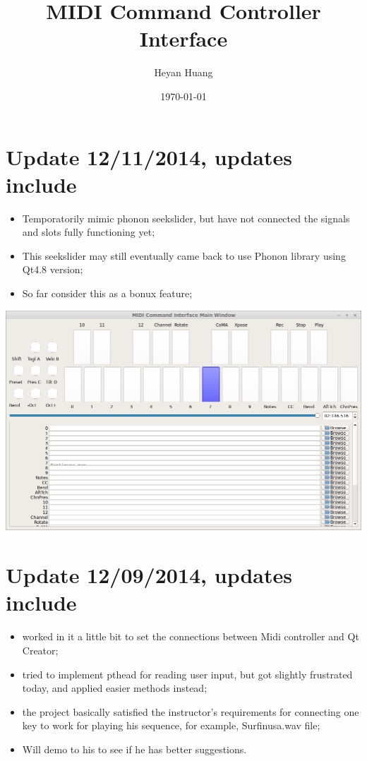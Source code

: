 \documentclass[9pt,b5paper]{article}
\author{Heyan Huang}
\date{\today}
\title{MIDI Command Controller Interface}
\begin{document}
\maketitle
\tableofcontents


\section{Update 12/11/2014, updates include}
\label{sec-1}
\begin{itemize}
\item Temporatorily mimic phonon seekslider, but have not connected the signals and slots fully functioning yet;
\item This seekslider may still eventually came back to use Phonon library using Qt4.8 version;
\item So far consider this as a bonux feature;
\end{itemize}
\includegraphics[width=.9\linewidth]{./pic/Screenshot_from_2014-12-11_13:33:46.png}

\section{Update 12/09/2014, updates include}
\label{sec-2}
\begin{itemize}
\item worked in it a little bit to set the connections between Midi controller and Qt Creator;
\item tried to implement pthead for reading user input, but got slightly frustrated today, and applied easier methods instead;
\item the project basically satisfied the instructor's requirements for connecting one key to work for playing his sequence, for example, Surfinusa.wav file;
\item Will demo to his to see if he has better suggestions.
\end{itemize}
\end{document}
